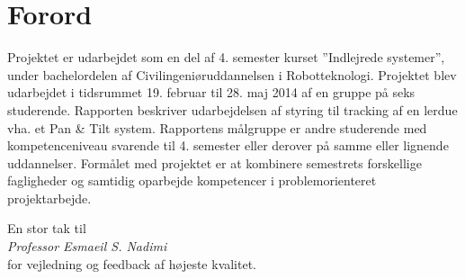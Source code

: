\section*{Forord}
Projektet er udarbejdet som en del af 4. semester kurset ”Indlejrede systemer”, under bachelordelen af Civilingeniøruddannelsen i Robotteknologi. 
Projektet blev udarbejdet i tidsrummet 19. februar til 28. maj 2014 af en gruppe på seks studerende.
Rapporten beskriver udarbejdelsen af styring til tracking af en lerdue vha. et Pan \& Tilt system.
Rapportens målgruppe er andre studerende med kompetenceniveau svarende til 4. semester eller derover på samme eller lignende uddannelser.
Formålet med projektet er at kombinere semestrets forskellige fagligheder og samtidig oparbejde kompetencer i problemorienteret projektarbejde.
\bigskip
\begin{center}
En stor tak til \\
\textit{Professor Esmaeil S. Nadimi} \\ 
for vejledning og feedback af højeste kvalitet.
\end{center}





